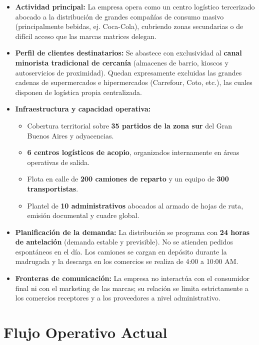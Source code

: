 \documentclass[11pt,a4paper]{article}
\begin{document}
\begin{itemize}
  \item \textbf{Actividad principal:} La empresa opera como un centro logístico tercerizado abocado a la distribución de grandes compañías de consumo masivo (principalmente bebidas, ej. Coca-Cola), cubriendo zonas secundarias o de difícil acceso que las marcas matrices delegan.
  \item \textbf{Perfil de clientes destinatarios:} Se abastece con exclusividad al \textbf{canal minorista tradicional de cercanía} (almacenes de barrio, kioscos y autoservicios de proximidad). Quedan expresamente excluidas las grandes cadenas de supermercados e hipermercados (Carrefour, Coto, etc.), las cuales disponen de logística propia centralizada.
  \item \textbf{Infraestructura y capacidad operativa:}
  \begin{itemize}
    \item Cobertura territorial sobre \textbf{35 partidos de la zona sur} del Gran Buenos Aires y adyacencias.
    \item \textbf{6 centros logísticos de acopio}, organizados internamente en áreas operativas de salida.
    \item Flota en calle de \textbf{200 camiones de reparto} y un equipo de \textbf{300 transportistas}.
    \item Plantel de \textbf{10 administrativos} abocados al armado de hojas de ruta, emisión documental y cuadre global.
  \end{itemize}
  \item \textbf{Planificación de la demanda:} La distribución se programa con \textbf{24 horas de antelación} (demanda estable y previsible). No se atienden pedidos espontáneos en el día. Los camiones se cargan en depósito durante la madrugada y la descarga en los comercios se realiza de 4:00 a 10:00 AM.
  \item \textbf{Fronteras de comunicación:} La empresa no interactúa con el consumidor final ni con el marketing de las marcas; su relación se limita estrictamente a los comercios receptores y a los proveedores a nivel administrativo.
\end{itemize}

\section{Flujo Operativo Actual}
\end{document}
